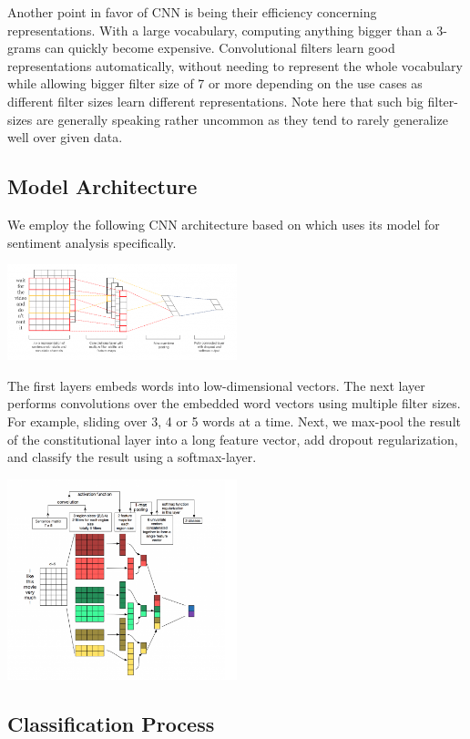 \documentclass[10pt, oneside]{article}
\begin{document}
\begin{multicols}{2}
Another point in favor of CNN is being their efficiency concerning representations.  With a large vocabulary, computing anything bigger than a 3-grams can quickly become expensive.  Convolutional filters learn good representations automatically, without needing to represent the whole vocabulary while allowing bigger filter size of 7 or more depending on the use cases as different filter sizes learn different representations. Note here that such big filter-sizes are generally speaking rather uncommon as they tend to rarely generalize well over given data.

\subsection{Model Architecture}

We employ the following CNN architecture based on \cite{Kim2014} which uses its model for sentiment analysis specifically.

\includegraphics[width=0.5\textwidth]{images/cnn_architecture1.png}

The first layers embeds words into low-dimensional vectors. The next layer performs convolutions over the embedded word vectors using multiple filter sizes. For example, sliding over 3, 4 or 5 words at a time. Next, we max-pool the result of the constitutional layer into a long feature vector, add dropout regularization, and classify the result using a softmax-layer.

\includegraphics[width=0.5\textwidth]{images/cnn_architecture2.png}

\subsection{Classification Process}


\end{multicols}
\end{document}
